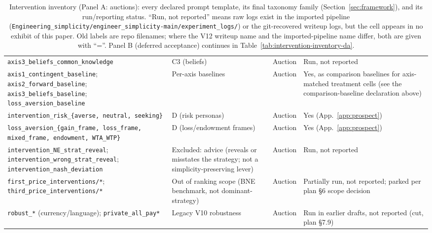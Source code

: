 \begin{table}[p]
\begin{tabular}{p{4.9cm} p{3.3cm} p{1.0cm} p{4.4cm}}
\texttt{axis3\_beliefs\_common\_knowledge} & C3 (beliefs) & Auction & Run, not reported \\
\texttt{axis1\_contingent\_baseline}; \texttt{axis2\_forward\_baseline}; \texttt{axis3\_beliefs\_baseline}; \texttt{loss\_aversion\_baseline} & Per-axis baselines & Auction & Yes, as comparison baselines for axis-matched treatment cells (see the comparison-baseline declaration above) \\
\texttt{intervention\_risk\_\{averse, neutral, seeking\}} & D (risk personas) & Auction & Yes (App.~\ref{app:prospect}) \\
\texttt{loss\_aversion\_\{gain\_frame, loss\_frame, mixed\_frame, endowment, WTA\_WTP\}} & D (loss/endowment frames) & Auction & Yes (App.~\ref{app:prospect}) \\
\texttt{intervention\_NE\_strat\_reveal}; \texttt{intervention\_wrong\_strat\_reveal}; \texttt{intervention\_nash\_deviation} & Excluded: advice (reveals or misstates the strategy; not a simplicity-preserving lever) & Auction & Run, not reported \\
\texttt{first\_price\_interventions/*}; \texttt{third\_price\_interventions/*} & Out of ranking scope (BNE benchmark, not dominant-strategy) & Auction & Partially run, not reported; parked per plan \S6 scope decision \\
\texttt{robust\_*} (currency/language); \texttt{private\_all\_pay*} & Legacy V10 robustness & Auction & Run in earlier drafts, not reported (cut, plan \S7.9) \\
\bottomrule
\end{tabular}
\caption{Intervention inventory (Panel A: auctions): every declared prompt template, its final taxonomy family (Section~\ref{sec:framework}), and its run/reporting status. ``Run, not reported'' means raw logs exist in the imported pipeline (\texttt{Engineering\_simplicity/engineer\_simplicity-main/experiment\_logs/}) or the git-recovered writeup logs, but the cell appears in no exhibit of this paper. Old labels are repo filenames; where the V12 writeup name and the imported-pipeline name differ, both are given with ``=''. Panel B (deferred acceptance) continues in Table~\ref{tab:intervention-inventory-da}.}
\label{tab:intervention-inventory}
\end{table}

